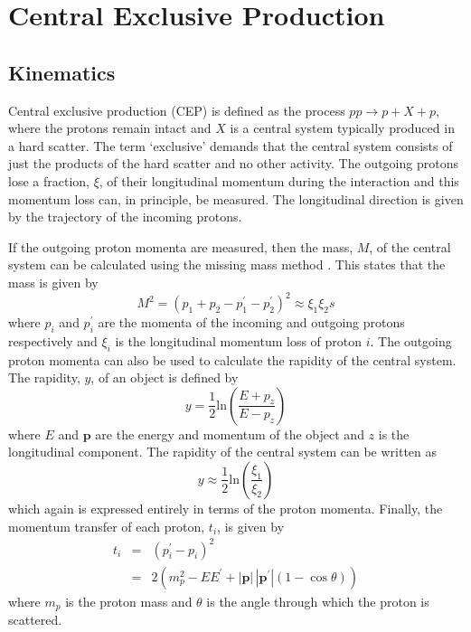 \section{Central Exclusive Production}

\subsection{Kinematics}

Central exclusive production (CEP) is defined as the process $p p \rightarrow p + X + p$, where the protons remain intact and $X$ is a central system typically produced in a hard scatter. The term `exclusive' demands that the central system consists of just the products of the hard scatter and no other activity. The outgoing protons lose a fraction, $\xi$, of their longitudinal momentum during the interaction and this momentum loss can, in principle, be measured. The longitudinal direction is given by the trajectory of the incoming protons. 

If the outgoing proton momenta are measured, then the mass, $M$, of the central system can be calculated using the missing mass method \cite{Albrow:2000na}. This states that the mass is given by
\begin {equation}\label{missingmass}
M^2 = \left(p_1 + p_2 - p_{1}^{\prime} - p_2^{\prime} \right)^2 \approx \xi_1 \xi_2  s
\end{equation}
where $p_i$ and $p_i^{\prime}$ are the momenta of the incoming and outgoing protons respectively and $\xi_i$ is the longitudinal momentum loss of proton $i$. The outgoing proton momenta can also be used to calculate the rapidity of the central system. The rapidity, $y$, of an object is defined by
\begin{equation}\label{rapidity}
y = \frac{1}{2}\text{ln}\left( \frac{E + p_z}{E - p_z} \right) 
\end{equation}
where $E$ and $\textbf{p}$ are the energy and momentum of the object and $z$ is the longitudinal component.
The rapidity of the central system can be written as
\begin{equation}\label{ceprapidity}
y \approx \frac{1}{2}\text{ln}\left(\frac{\xi_1}{\xi_2} \right)
\end{equation}
which again is expressed entirely in terms of the proton momenta.
Finally, the momentum transfer of each proton, $t_i$, is given by
\begin{eqnarray}
 t_i  & = &  \left( p_{i}^{\prime} - p_{i} \right)^2   \\
  & = & 2 \left( m_p^2 - E E^{\prime} + |\textbf{p}| \, |\textbf{p}^{\prime}| \left(1-\cos\theta \right) \right)       \nonumber
\end{eqnarray}
where $m_p$ is the proton mass and $\theta$ is the angle through which the proton is scattered. 

